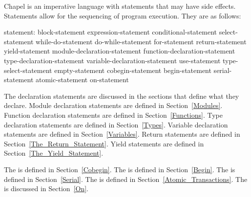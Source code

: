 
Chapel is an imperative language with statements that may have side
effects.  Statements allow for the sequencing of program execution.
They are as follows:
\begin{syntax}
statement:
  block-statement
  expression-statement
  conditional-statement
  select-statement
  while-do-statement
  do-while-statement
  for-statement
  return-statement
  yield-statement
  module-declaration-statement
  function-declaration-statement
  type-declaration-statement
  variable-declaration-statement
  use-statement
  type-select-statement
  empty-statement
  cobegin-statement
  begin-statement
  serial-statement
  atomic-statement
  on-statement
\end{syntax}

The declaration statements are discussed in the sections that define
what they declare.  Module declaration statements are defined in
Section~\ref{Modules}.  Function declaration statements are defined in
Section~\ref{Functions}.  Type declaration statements are defined in
Section~\ref{Types}.  Variable declaration statements are defined in
Section~\ref{Variables}.  Return statements are defined in
Section~\ref{The_Return_Statement}.  Yield statements are defined in
Section~\ref{The_Yield_Statement}.

The  is defined in Section~\ref{Cobegin}.
The  is defined in Section~\ref{Begin}.
The  is defined in Section~\ref{Serial}.
The  is defined in
Section~\ref{Atomic_Transactions}.  The  is
discussed in Section~\ref{On}.
